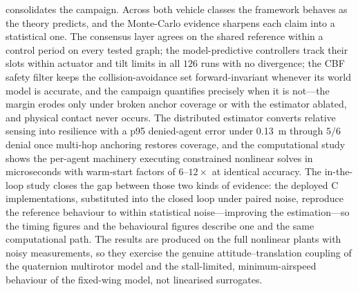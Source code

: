  consolidates the campaign. Across both vehicle classes the
framework behaves as the theory predicts, and the Monte-Carlo evidence sharpens
each claim into a statistical one. The consensus layer agrees on the shared
reference within a control period on every tested graph; the model-predictive
controllers track their slots within actuator and tilt limits in all $126$ runs
with no divergence; the CBF safety filter keeps the collision-avoidance set
forward-invariant whenever its world model is accurate, and the campaign
quantifies precisely when it is not---the margin erodes only under broken anchor
coverage or with the estimator ablated, and physical contact never occurs. The
distributed estimator converts relative sensing into resilience with a p95
denied-agent error under \SI{0.13}{\meter} through $5/6$ denial once multi-hop
anchoring restores coverage, and the computational study shows the per-agent
machinery executing constrained nonlinear solves in microseconds with
warm-start factors of $6$--$12\times$ at identical accuracy. The in-the-loop
study closes the gap between those two kinds of evidence: the deployed C
implementations, substituted into the closed loop under paired noise,
reproduce the reference behaviour to within statistical noise---improving the
estimation---so the timing figures and the behavioural figures describe one
and the same computational path. The results are produced on the full nonlinear plants with
noisy measurements, so they exercise the genuine attitude--translation coupling
of the quaternion multirotor model and the stall-limited, minimum-airspeed
behaviour of the fixed-wing model, not linearised surrogates.

